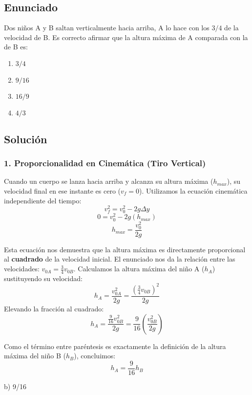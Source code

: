 \documentclass[12pt, a4paper]{article}
\begin{document}
\newpage

\subsection*{Enunciado}
Dos niños A y B saltan verticalmente hacia arriba, A lo hace con los $3/4$ de la velocidad de B. Es correcto afirmar que la altura máxima de A comparada con la de B es:
\begin{enumerate}[label=\alph*)]
    \item $3/4$
    \item $9/16$
    \item $16/9$
    \item $4/3$
\end{enumerate}

\subsection*{Solución}

\subsubsection*{1. Proporcionalidad en Cinemática (Tiro Vertical)}
Cuando un cuerpo se lanza hacia arriba y alcanza su altura máxima ($h_{max}$), su velocidad final en ese instante es cero ($v_f = 0$). 
Utilizamos la ecuación cinemática independiente del tiempo:
$$ v_f^2 = v_0^2 - 2g \Delta y $$
$$ 0 = v_0^2 - 2g(h_{max}) $$
$$ h_{max} = \frac{v_0^2}{2g} $$

Esta ecuación nos demuestra que la altura máxima es directamente proporcional al \textbf{cuadrado} de la velocidad inicial.
El enunciado nos da la relación entre las velocidades: $v_{0A} = \frac{3}{4} v_{0B}$.
Calculamos la altura máxima del niño A ($h_A$) sustituyendo su velocidad:
$$ h_A = \frac{v_{0A}^2}{2g} = \frac{\left(\frac{3}{4} v_{0B}\right)^2}{2g} $$
Elevando la fracción al cuadrado:
$$ h_A = \frac{\frac{9}{16} v_{0B}^2}{2g} = \frac{9}{16} \left( \frac{v_{0B}^2}{2g} \right) $$

Como el término entre paréntesis es exactamente la definición de la altura máxima del niño B ($h_B$), concluimos:
$$ h_A = \frac{9}{16} h_B $$

\begin{tcolorbox}[colback=green!5!white, colframe=green!50!black, title=Respuesta Final]
\centering \Large b) 9/16
\end{tcolorbox}

\newpage
\end{document}
